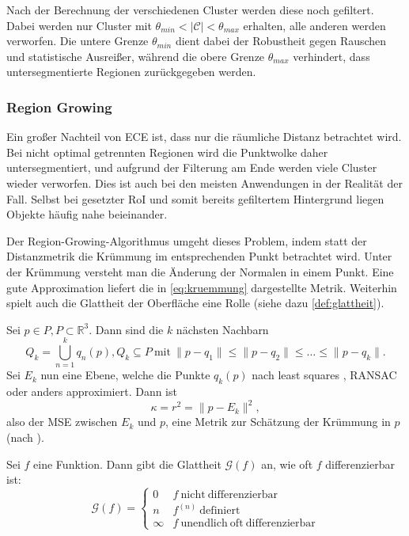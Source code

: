 Nach der Berechnung der verschiedenen Cluster werden diese noch gefiltert.
Dabei werden nur Cluster mit $\theta_{min} < |\mathcal{C}| < \theta_{max}$ erhalten, alle anderen werden verworfen.
Die untere Grenze $\theta_{min}$ dient dabei der Robustheit gegen Rauschen und statistische Ausreißer, während die obere Grenze $\theta_{max}$ verhindert, dass untersegmentierte Regionen zurückgegeben werden.

\subsubsection{Region Growing}
\label{subsubsec:region-growing}

Ein großer Nachteil von \ac{ECE} ist, dass nur die räumliche Distanz betrachtet wird.
Bei nicht optimal getrennten Regionen wird die Punktwolke daher untersegmentiert, und aufgrund der Filterung am Ende werden viele Cluster wieder verworfen.
Dies ist auch bei den meisten Anwendungen in der Realität der Fall.
Selbst bei gesetzter \ac{RoI} und somit bereits gefiltertem Hintergrund liegen Objekte häufig nahe beieinander.

Der Region-Growing-Algorithmus umgeht dieses Problem, indem statt der Distanzmetrik die Krümmung im entsprechenden Punkt betrachtet wird.
Unter der Krümmung versteht man die Änderung der Normalen in einem Punkt.
Eine gute Approximation liefert die in \autoref{eq:kruemmung} dargestellte Metrik.
Weiterhin spielt auch die Glattheit der Oberfläche eine Rolle (siehe dazu \autoref{def:glattheit}).

\begin{definition}
Sei $p \in P, P \subset \mathbb{R}^3$.
Dann sind die $k$ nächsten Nachbarn
\begin{equation}
\label{eq:k-nearest-neighbors}
Q_k = \bigcup\limits_{n=1}^{k} q_n(p), Q_k \subseteq P\ 
\mathrm{mit}\ 
\|p - q_1\| \leq \|p - q_2\| \leq \dotsc \leq \|p - q_k\|.
\end{equation}
Sei $E_k$ nun eine Ebene, welche die Punkte $q_k(p)$ nach least squares \cite{schomaker1959fit}, RANSAC \cite{fischler1981random} oder anders approximiert.
Dann ist
\begin{equation}
\label{eq:kruemmung}
\kappa = r^2 = \|p - E_k\|^2,
\end{equation}
also der \ac{MSE} zwischen $E_k$ und $p$, eine Metrik zur Schätzung der Krümmung in $p$ (nach \cite[Abs. 2.1.2]{rabbani2006segmentation}).
\end{definition}

\begin{definition}
\label{def:glattheit}
Sei $f$ eine Funktion.
Dann gibt die Glattheit $\mathcal{G}(f)$ an, wie oft $f$ differenzierbar ist:
\begin{equation}
\mathcal{G}(f) = \left\{\begin{array}{ll}
0 & f\ \mathrm{nicht\ differenzierbar}\\
n & f^{(n)}\ \mathrm{definiert}\\
\infty & f\ \mathrm{unendlich\ oft\ differenzierbar}
\end{array}\right.
\end{equation}
\end{definition}

